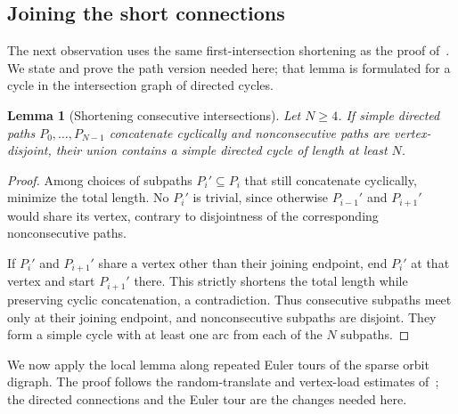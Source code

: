 \documentclass[11pt,a4paper,reqno]{amsart}
\newtheorem{lemma}[theorem]{Lemma}
\theoremstyle{definition}
\theoremstyle{remark}
\numberwithin{equation}{section}
\begin{document}
\subsection{Joining the short connections}
The next observation uses the same first-intersection shortening as the proof of~\cite[Lemma 2.8]{BHMSY}. We state and prove the path version needed here; that lemma is formulated for a cycle in the intersection graph of directed cycles.

\begin{lemma}[Shortening consecutive intersections]\label{lem:shortening}
Let $N\ge4$. If simple directed paths $P_0,\ldots,P_{N-1}$ concatenate cyclically and nonconsecutive paths are vertex-disjoint, their union contains a simple directed cycle of length at least $N$.
\end{lemma}
\begin{proof}
Among choices of subpaths $P_i'\subseteq P_i$ that still concatenate cyclically, minimize the total length. No $P_i'$ is trivial, since otherwise $P_{i-1}'$ and $P_{i+1}'$ would share its vertex, contrary to disjointness of the corresponding nonconsecutive paths.

If $P_i'$ and $P_{i+1}'$ share a vertex other than their joining endpoint, end $P_i'$ at that vertex and start $P_{i+1}'$ there. This strictly shortens the total length while preserving cyclic concatenation, a contradiction. Thus consecutive subpaths meet only at their joining endpoint, and nonconsecutive subpaths are disjoint. They form a simple cycle with at least one arc from each of the $N$ subpaths.
\end{proof}

We now apply the local lemma along repeated Euler tours of the sparse orbit digraph. The proof follows the random-translate and vertex-load estimates of~\cite[Lemmas 4.5 and 4.6]{LiMethuku}; the directed connections and the Euler tour are the changes needed here.
\end{document}
